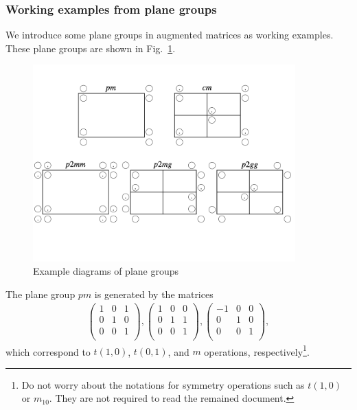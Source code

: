 \subsubsection{Working examples from plane groups}

We introduce some plane groups in augmented matrices as working examples.
These plane groups are shown in Fig.~\ref{fig:plane-group-diagrams}.

\begin{figure}[htb]
  \centering
  \includegraphics[width=0.9\textwidth]{figure/fig_plane_groups.png}
  \caption{Example diagrams of plane groups}
  \label{fig:plane-group-diagrams}
\end{figure}


The plane group $pm$ is generated by the matrices
\begin{align*}
  \left(
    \begin{array}{cc|c}
        1 & 0 & 1 \\
        0 & 1 & 0 \\
        \hline
        0 & 0 & 1 \\
    \end{array}
  \right),
  \left(
    \begin{array}{cc|c}
        1 & 0 & 0 \\
        0 & 1 & 1 \\
        \hline
        0 & 0 & 1 \\
    \end{array}
  \right),
  \left(
    \begin{array}{cc|c}
        -1 & 0 & 0 \\
        0  & 1 & 0 \\
        \hline
        0 & 0 & 1 \\
    \end{array}
  \right),
\end{align*}
which correspond to $t(1, 0)$, $t(0, 1)$, and $m$ operations, respectively\footnote{
  Do not worry about the notations for symmetry operations such as $t(1, 0)$ or $m_{10}$.
  They are not required to read the remained document.
}.

